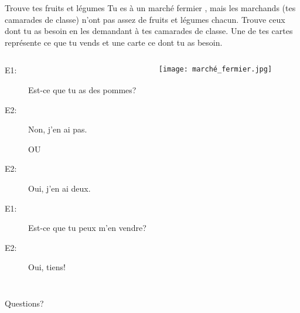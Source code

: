\documentclass{beamer}
\begin{document}
  \begin{frame}{Trouve tes fruits et légumes}
    Tu es à un marché fermier , mais les marchands (tes camarades de classe) n'ont pas assez de fruits et légumes chacun.
    Trouve ceux dont tu as besoin en les demandant à tes camarades de classe.
    Une de tes cartes représente ce que tu vends et une carte ce dont tu as besoin. \\
    \begin{columns}
        \small
        \begin{description}
          \item[E1:] Est-ce que tu as des pommes?
          \item[E2:] Non, j'\alert{en} ai pas.
          \item[] OU
          \item[E2:] Oui, j'\alert{en} ai \alert{deux}.
          \item[E1:] Est-ce que tu peux m'\alert{en} vendre?
          \item[E2:] Oui, tiens!
        \end{description}
        \begin{center}
          \texttt{[image: marché\_fermier.jpg]}
        \end{center}
    \end{columns}
  \end{frame}

  \begin{frame}{}
    \begin{center}
      \Large Questions?
    \end{center}
  \end{frame}
\end{document}
